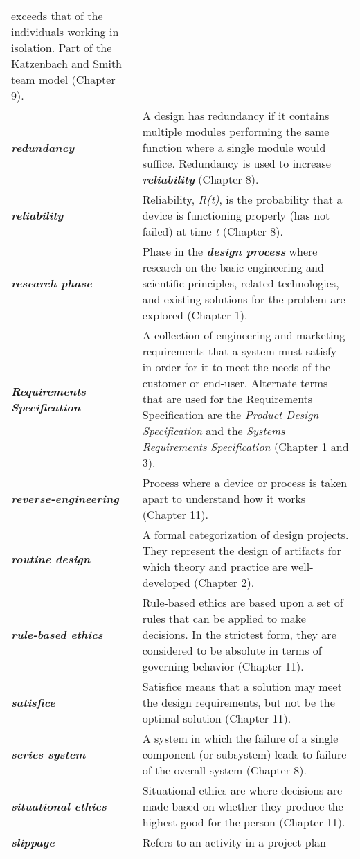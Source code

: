 \begin{longtable}[]{@{}
  >{\raggedright\arraybackslash}p{}
  >{\raggedright\arraybackslash}p{}@{}}
exceeds that of the individuals working in isolation. Part of the
Katzenbach and Smith team model (Chapter 9). \\
\emph{\textbf{redundancy}} & A design has redundancy if it contains
multiple modules performing the same function where a single module
would suffice. Redundancy is used to increase
\emph{\textbf{reliability}} (Chapter 8). \\
\emph{\textbf{reliability}} & Reliability, \emph{R(t)}, is the
probability that a device is functioning properly (has not failed) at
time \emph{t} (Chapter 8). \\
\emph{\textbf{research phase}} & Phase in the \emph{\textbf{design
process}} where research on the basic engineering and scientific
principles, related technologies, and existing solutions for the problem
are explored (Chapter 1). \\
\emph{\textbf{Requirements Specification}} & A collection of engineering
and marketing requirements that a system must satisfy in order for it to
meet the needs of the customer or end-user. Alternate terms that are
used for the Requirements Specification are the \emph{Product Design
Specification} and the \emph{Systems Requirements Specification}
(Chapter 1 and 3). \\
\emph{\textbf{reverse-engineering}} & Process where a device or process
is taken apart to understand how it works (Chapter 11). \\
\emph{\textbf{routine design}} & A formal categorization of design
projects. They represent the design of artifacts for which theory and
practice are well-developed (Chapter 2). \\
\emph{\textbf{rule-based ethics}} & Rule-based ethics are based upon a
set of rules that can be applied to make decisions. In the strictest
form, they are considered to be absolute in terms of governing behavior
(Chapter 11). \\
\emph{\textbf{satisfice}} & Satisfice means that a solution may meet the
design requirements, but not be the optimal solution (Chapter 11). \\
\emph{\textbf{series system}} & A system in which the failure of a
single component (or subsystem) leads to failure of the overall system
(Chapter 8). \\
\emph{\textbf{situational ethics}} & Situational ethics are where
decisions are made based on whether they produce the highest good for
the person (Chapter 11). \\
\emph{\textbf{slippage}} & Refers to an activity in a project plan

\end{longtable}
